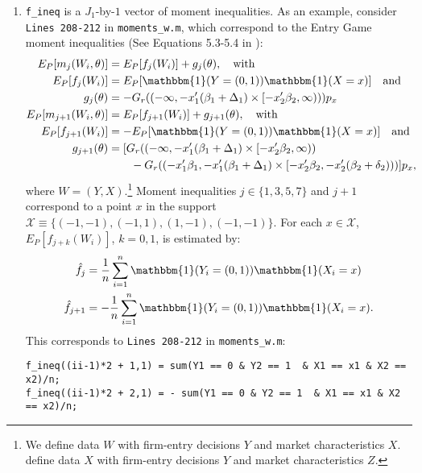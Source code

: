 \documentclass[12pt]{article}
\def\code#1{\texttt{#1}}
\begin{document}
\begin{enumerate}
\item \code{f\_ineq} is a $J_1$-by-$1$ vector of moment inequalities.  As an example, consider \code{Lines 208-212} in \code{moments\_w.m}, which correspond to the Entry Game moment inequalities (See Equations 5.3-5.4 in ):
    \footnotesize
    \begin{align*}
    E_P[m_{j}(W_i,\theta)] & = E_P[ f_{j}(W_i)] + g_{j}(\theta), \quad \text{with} \\
    E_P[ f_{j}(W_i)] & = E_P[\mathbbm{1}(Y = (0,1)) \mathbbm{1}(X = x)] \quad \text{and} \\
    g_{j}(\theta) &=  - G_r((-\infty,-x_1'(\beta_1 + \Delta_1) \times [-x_2'\beta_2,\infty)))p_x\\
     E_P[m_{j+1}(W_i,\theta)] & =E_P[ f_{j+1}(W_i)]  + g_{j+1}(\theta), \quad \text{with}   \\
  E_P[ f_{j+1}(W_i)] & = -E_P[\mathbbm{1}(Y = (0,1)) \mathbbm{1}(X = x)] \quad \text{and} \\
    g_{j+1}(\theta) & = [G_r((-\infty,-x_1'(\beta_1 + \Delta_1) \times [-x_2'\beta_2,\infty))  \\
    & \quad \quad -G_r((-x_1'\beta_1,-x_1'(\beta_1 + \Delta_1) \times [-x_2'\beta_2,-x_2'(\beta_2 + \delta_2)))]p_x,
    \end{align*}\normalsize
    where $W = (Y,X)$.\footnote{We define data $W$ with firm-entry decisions $Y$ and market characteristics $X$.  define data $X$ with firm-entry decisions $Y$ and market characteristics $Z$.} Moment inequalities $j \in \{1,3,5,7\}$ and $j+1$ correspond to a point $x$ in the support $\mathcal{X} \equiv \{(-1,-1),(-1,1),(1,-1),(-1,-1)\}$.  For each $x \in \mathcal{X}$,  $E_P[ f_{j+k}(W_i)]$, $k=0,1$,  is estimated by:
    \begin{align*}
  \hat  f_{j} & = \frac{1}{n} \sum_{i=1}^n \mathbbm{1}(Y_i = (0,1)) \mathbbm{1}(X_i = x) \\
   \hat f_{j+1} & = -\frac{1}{n} \sum_{i=1}^n \mathbbm{1}(Y_i = (0,1)) \mathbbm{1}(X_i = x).
    \end{align*}
    This corresponds to \code{Lines 208-212} in \code{moments\_w.m}:
    \footnotesize
    \begin{lstlisting}[backgroundcolor = \color{gray!30},
                   xleftmargin = 0cm,
                   framexleftmargin = 1em]
f_ineq((ii-1)*2 + 1,1) = sum(Y1 == 0 & Y2 == 1  & X1 == x1 & X2 == x2)/n;
f_ineq((ii-1)*2 + 2,1) = - sum(Y1 == 0 & Y2 == 1  & X1 == x1 & X2 == x2)/n;
    \end{lstlisting}\normalsize


\end{enumerate}
\end{document}
